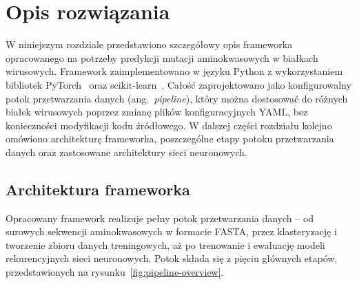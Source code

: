 \newpage
\section{Opis rozwiązania}
\label{sec:opis-rozwiazania}

W niniejszym rozdziale przedstawiono szczegółowy opis frameworka opracowanego na potrzeby predykcji mutacji aminokwasowych w białkach wirusowych. Framework zaimplementowano w języku Python z wykorzystaniem bibliotek PyTorch~\cite{paszke2019pytorch} oraz scikit-learn~\cite{pedregosa2011sklearn}. Całość zaprojektowano jako konfigurowalny potok przetwarzania danych (ang.~\emph{pipeline}), który można dostosować do różnych białek wirusowych poprzez zmianę plików konfiguracyjnych YAML, bez konieczności modyfikacji kodu źródłowego. W dalszej części rozdziału kolejno omówiono architekturę frameworka, poszczególne etapy potoku przetwarzania danych oraz zastosowane architektury sieci neuronowych.

\subsection{Architektura frameworka}
\label{subsec:architektura}

Opracowany framework realizuje pełny potok przetwarzania danych -- od surowych sekwencji aminokwasowych w formacie FASTA, przez klasteryzację i tworzenie zbioru danych treningowych, aż po trenowanie i ewaluację modeli rekurencyjnych sieci neuronowych. Potok składa się z pięciu głównych etapów, przedstawionych na rysunku~\ref{fig:pipeline-overview}.

